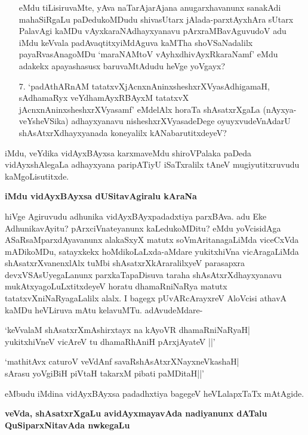 \begin{itemize}
eMdu tiLisiruvaMte, yAva naTarAjarAjana anugarxhavanunx sanakAdi mahaSiRgaLu paDedu\-koMDudu shivasUtarx jAlada-parxtAyxhAra sUtarx PalavAgi kaMDu vAyxkaraNAdhayxyanavu pArxraMBa\-vAgu\-vudoV adu iMdu keVvala padAvaqtitxyiMdAguva kaMTha shoVSaNadalilx payaRvasAna\-goMDu `maraNAMtoV vAyhxdhivAyxRkaraNamf'\label{41} eMdu adakekx apayashasusx baruvaMtAdudu heVge yoVgayx?

\item[7.] `padAthARnAM tatatxvXjAcnxnAninxsheshxrXVyasAdhigamaH,\label{41} sAdhamaRyx veYdhamAyxRBAyxM tatatxvX jAcnxnAninxsheshxrXVya\-samf'\label{41} eMdelAlx horaTa shAsatxrXgaLa (nAyxya-veYsheVSika) adhayxyanavu nisheshxrXVyasadeDege oyuyxvudeV\-nAdarU shAsAtxrXdhayxyanada kone\-yalilx kANabarutitxdeyeV?
\end{itemize}
iMdu, veYdika vidAyxBAyxsa karxmaveMdu shiroVPalaka paDeda vidAyxshAlegaLa adhayxyana paripATiyU iSaTxralilx tAneV mugiyutitxruvudu kaMgoLisutitxde.

{\bigskip
\noindent
{\large\bf iMdu vidAyxBAyxsa dUSitavAgiralu kAraNa}}\label{page12}
\medskip

\noindent
hiVge Agiruvudu adhunika vidAyxBAyxpadadxtiya parxBAva. adu Eke Adhunika\break\-vAyitu? pArxciVnate\-yanunx kaLedukoMDitu? eMdu yoVcisidAga ASaRsaMparx\-dAyavanunx alakaSxyX matutx soVmAri\-tana\-gaLiMda viceCxVda mADikoMDu, satayxkekx hoMdikoLaLxda-aMdare yukitxhiVna vicAragaLiMda shAsatxrX\-vanenxlAlx tuMbi shAsatxrXkAra\-ralilxyeV parasapxra devxVSAsUyegaLanunx parxkaTapaDisuva taraha shAsAtxrXdhayxyanavu mukAtxya\-goLuLx\-titxdeyeV horatu dhamaRniNaRya matutx tatatxvXniNaRyagaLalilx  alalx. I bagegx pUvAR\-cArayxreV AloVcisi athavA kaMDu heVLiruva mAtu kelavuMTu. adAvudeMdare-

\begin{shloka}
`keVvalaM shAsatxrXmAshirxtayx na kAyoVR dhamaRniNaRyaH|\\\label{64}
yukitxhiVneV vicAreV tu dhamaRhAniH pArxjAyateV ||'
\end{shloka}

\smallskip

\begin{shloka}
`mathitAvx caturoV veVdAnf savaRshAsAtxrXNayxneVkashaH|\\\label{41}
sArasu yoVgiBiH piVtaH takarxM pibati paMDitaH||'
\end{shloka}
eMbudu iMdina vidAyxBAyxsa padadhxtiya bagegeV heVLalapxTaTx mAtAgide.

{\bigskip
\noindent
{\large\bf veVda, shAsatxrXgaLu avidAyxmayavAda nadiyanunx dATalu QuSiparxNitavAda nwkegaLu}}\label{page42}
\medskip

